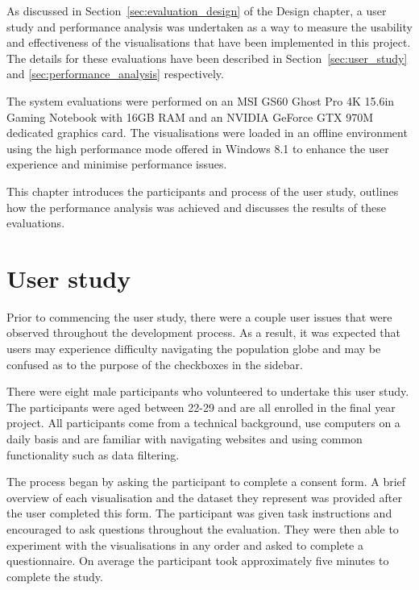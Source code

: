
As discussed in Section~\ref{sec:evaluation_design} of the Design chapter, a user study and performance analysis was undertaken as a way to measure the usability and effectiveness of the visualisations that have been implemented in this project. The details for these evaluations have been described in Section~\ref{sec:user_study} and \ref{sec:performance_analysis} respectively.

The system evaluations were performed on an MSI GS60 Ghost Pro 4K 15.6in Gaming Notebook with 16GB RAM and an NVIDIA GeForce GTX 970M dedicated graphics card. The visualisations were loaded in an offline environment using the high performance mode offered in Windows 8.1 to enhance the user experience and minimise performance issues.

This chapter introduces the participants and process of the user study, outlines how the performance analysis was achieved and discusses the results of these evaluations.

\section{User study} {
\label{sec:user_study}

	Prior to commencing the user study, there were a couple user issues that were observed throughout the development process. As a result, it was expected that users may experience difficulty navigating the population globe and may be confused as to the purpose of the checkboxes in the sidebar.

	There were eight male participants who volunteered to undertake this user study. The participants were aged between 22-29 and are all enrolled in the final year project. All participants come from a technical background, use computers on a daily basis and are familiar with navigating websites and using common functionality such as data filtering.

	The process began by asking the participant to complete a consent form. A brief overview of each visualisation and the dataset they represent was provided after the user completed this form. The participant was given task instructions and encouraged to ask questions throughout the evaluation. They were then able to experiment with the visualisations in any order and asked to complete a questionnaire. On average the participant took approximately five minutes to complete the study.

}

